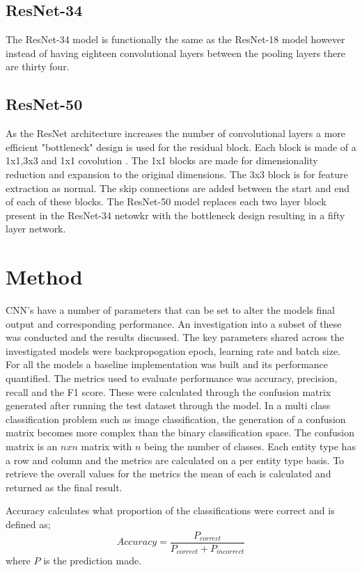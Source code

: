 \documentclass[10pt,twocolumn,letterpaper]{article}
\begin{document}
\subsection{ResNet-34}
The ResNet-34 model is functionally the same as the ResNet-18 model however instead of 
having eighteen convolutional layers between the pooling layers there are thirty four.
\subsection{ResNet-50}
As the ResNet architecture increases the number of convolutional layers a more efficient 
"bottleneck" design is used for the residual block. Each block is made of a 1x1,3x3 and 1x1 
covolution \cite{https://doi.org/10.48550/arxiv.1512.03385}. The 1x1 blocks are made for dimensionality reduction and expansion to the original 
dimensions. The 3x3 block is for feature extraction as normal. The skip connections are 
added between the start and end of each of these blocks. The ResNet-50 model replaces 
each two layer block present in the ResNet-34 netowkr with the bottleneck design resulting 
in a fifty layer network.
\section{Method}
CNN's have a number of parameters that can be set to alter the models final output and 
corresponding performance. An investigation into a subset of these was conducted and 
the results discussed. The key parameters shared across the investigated models were
backpropogation epoch, learning rate and batch size. For all the models a baseline 
implementation was built and its performance quantified. The metrics used to evaluate 
performance was accuracy, precision, recall and the F1 score. These were calculated through the confusion 
matrix generated after running the test dataset through the model. In a multi class 
classification problem such as image classification, the generation of a confusion 
matrix becomes more complex than the binary classification space. The confusion matrix 
is an $nxn$ matrix with $n$ being the number of classes. Each entity type has a row and 
column and the metrics are 
calculated on a per entity type basis. To retrieve the overall values for the metrics 
the mean of each is calculated and returned as the final result.

Accuracy calculates what proportion of the classifications were correct and is defined as;
\begin{equation}
   Accuracy = \dfrac{P_{correct}}{P_{correct} + P_{incorrect}}
\end{equation}
where $P$ is the prediction made.
\end{document}
